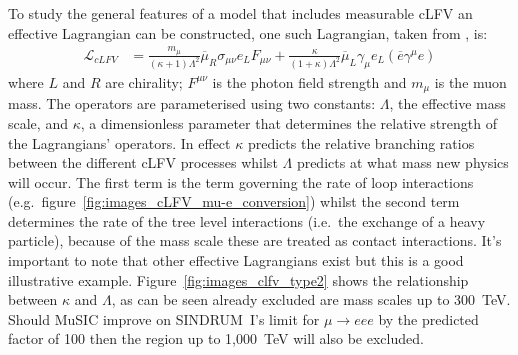 To study the general features of a model that includes measurable cLFV an effective Lagrangian can be constructed, one such Lagrangian, taken from \cite{effective_lagrangian_for_clfv}, is:
\begin{align}
  \mathcal{L}_{cLFV} &= 
      \frac{m_{\mu}}{(\kappa + 1)\Lambda^2}
      \overline{\mu}_R\sigma_{\mu\nu}e_L F_{\mu\nu} + 
      \frac{\kappa}{(1+\kappa)\Lambda^2}
      \overline{\mu}_L\gamma_{\mu}e_L
      (\overline{e}\gamma^{\mu}e) \label{equ:type2}
\end{align}
where \(L\) and \(R\) are chirality; \(F^{\mu\nu}\) is the photon field strength and \( m_{\mu} \) is the muon mass. The operators are parameterised using two constants: \(\Lambda\), the effective mass scale, and \(\kappa\), a dimensionless parameter that determines the relative strength of the Lagrangians' operators. In effect \(\kappa\) predicts the relative branching ratios between the different cLFV processes whilst \(\Lambda\) predicts at what mass new physics will occur. The first term is the term governing the rate of loop interactions (e.g.\ figure~\ref{fig:images_cLFV_mu-e_conversion}) whilst the second term determines the rate of the tree level interactions (i.e.\ the exchange of a heavy particle), because of the mass scale these are treated as contact interactions. It's important to note that other effective Lagrangians exist but this is a good illustrative example. Figure~\ref{fig:images_clfv_type2} shows the relationship between \(\kappa\) and \(\Lambda\), as can be seen already excluded are mass scales up to 300~TeV. Should MuSIC improve on SINDRUM~I's limit for \( \mu\rightarrow eee \) by the predicted factor of 100 then the region up to 1,000~TeV will also be excluded.

